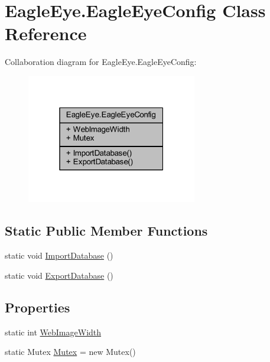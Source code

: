 \hypertarget{class_eagle_eye_1_1_eagle_eye_config}{}\section{Eagle\+Eye.\+Eagle\+Eye\+Config Class Reference}
\label{class_eagle_eye_1_1_eagle_eye_config}


Collaboration diagram for Eagle\+Eye.\+Eagle\+Eye\+Config\+:\nopagebreak
\begin{figure}[H]
\begin{center}
\leavevmode
\includegraphics[width=211pt]{class_eagle_eye_1_1_eagle_eye_config__coll__graph}
\end{center}
\end{figure}
\subsection*{Static Public Member Functions}
\begin{DoxyCompactItemize}
\item 
static void \mbox{\hyperlink{class_eagle_eye_1_1_eagle_eye_config_a321d469bb1a71e255f2318ad1ec30058}{Import\+Database}} ()
\item 
static void \mbox{\hyperlink{class_eagle_eye_1_1_eagle_eye_config_ae238a449c2d6a52f9825fb75096e2299}{Export\+Database}} ()
\end{DoxyCompactItemize}
\subsection*{Properties}
\begin{DoxyCompactItemize}
\item 
static int \mbox{\hyperlink{class_eagle_eye_1_1_eagle_eye_config_a0b439fa02236aa8c7aa11eeb66b1e80c}{Web\+Image\+Width}}
\item 
static Mutex \mbox{\hyperlink{class_eagle_eye_1_1_eagle_eye_config_a69b4d9e94fceeaf4fad38f727b614b66}{Mutex}} = new Mutex()
\end{DoxyCompactItemize}



